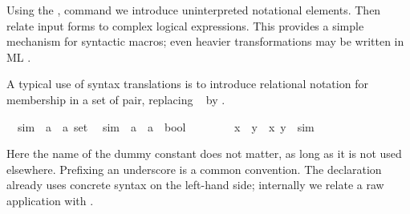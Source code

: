 \begin{isabellebody}
\begin{isamarkuptext}
  Using the , command we
  introduce uninterpreted notational elements.  Then
   relate input forms to complex logical
  expressions.  This provides a simple mechanism for syntactic macros;
  even heavier transformations may be written in ML
  \cite{isabelle-ref}.

  \medskip A typical use of syntax translations is to introduce
  relational notation for membership in a set of pair, replacing \
   by .%
\end{isamarkuptext}%
\isamarkuptrue%
\isanewline
\ \ sim\ {\isacharcolon}{\isacharcolon}\ {\isachardoublequote}{\isacharparenleft}{\isacharprime}a\ {\isasymtimes}\ {\isacharprime}a{\isacharparenright}\ set{\isachardoublequote}\isanewline
\isanewline
\isamarkupfalse%
\isanewline
\ \ {\isachardoublequote}{\isacharunderscore}sim{\isachardoublequote}\ {\isacharcolon}{\isacharcolon}\ {\isachardoublequote}{\isacharprime}a\ {\isasymRightarrow}\ {\isacharprime}a\ {\isasymRightarrow}\ bool{\isachardoublequote}\ \ \ \ {\isacharparenleft}\ {\isachardoublequote}{\isasymapprox}{\isachardoublequote}\ {}{}{\isacharparenright}\isanewline
\isamarkupfalse%
\isanewline
\ \ {\isachardoublequote}x\ {\isasymapprox}\ y{\isachardoublequote}\ {\isasymrightleftharpoons}\ {\isachardoublequote}{\isacharparenleft}x{\isacharcomma}\ y{\isacharparenright}\ {\isasymin}\ sim{\isachardoublequote}\isamarkupfalse%
%
\begin{isamarkuptext}%
\noindent Here the name of the dummy constant  does
  not matter, as long as it is not used elsewhere.  Prefixing an
  underscore is a common convention.  The 
  declaration already uses concrete syntax on the left-hand side;
  internally we relate a raw application  with
  .


\end{isamarkuptext}
\end{isabellebody}
